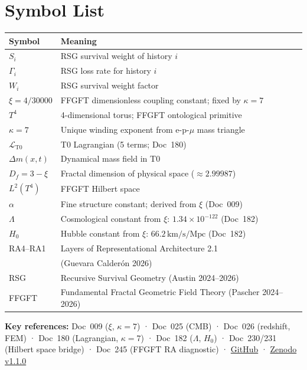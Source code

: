 \section{Symbol List}

{\small
\begin{tabular}{p{3cm}p{10.5cm}}
\toprule
\textbf{Symbol} & \textbf{Meaning} \\
\midrule
$S_i$ & RSG survival weight of history $i$ \\
$\Gamma_i$ & RSG loss rate for history $i$ \\
$W_i$ & RSG survival weight factor \\
$\xi = 4/30000$ & FFGFT dimensionless coupling constant; fixed by $\kappa=7$ \\
$T^4$ & 4-dimensional torus; FFGFT ontological primitive \\
$\kappa = 7$ & Unique winding exponent from e-p-$\mu$ mass triangle \\
$\mathcal{L}_{\text{T0}}$ & T0 Lagrangian (5 terms; Doc~180) \\
$\Delta m(x,t)$ & Dynamical mass field in T0 \\
$D_f = 3-\xi$ & Fractal dimension of physical space ($\approx 2.99987$) \\
$L^2(T^4)$ & FFGFT Hilbert space \\
$\alpha$ & Fine structure constant; derived from $\xi$ (Doc~009) \\
$\Lambda$ & Cosmological constant from $\xi$: $1.34\times10^{-122}$ (Doc~182) \\
$H_0$ & Hubble constant from $\xi$: $66.2\,\text{km/s/Mpc}$ (Doc~182) \\
RA4--RA1 & Layers of Representational Architecture 2.1\\
          & \quad (Guevara Calderón 2026) \\
RSG & Recursive Survival Geometry (Austin 2024--2026) \\
FFGFT & Fundamental Fractal Geometric Field Theory (Pascher 2024--2026) \\
\bottomrule
\end{tabular}
}

\vspace{1em}
\noindent\textbf{Key references:}
Doc~009 ($\xi$, $\kappa=7$) ·
Doc~025 (CMB) ·
Doc~026 (redshift, FEM) ·
Doc~180 (Lagrangian, $\kappa=7$) ·
Doc~182 ($\Lambda$, $H_0$) ·
Doc~230/231 (Hilbert space bridge) ·
Doc~245 (FFGFT RA diagnostic) ·
\href{https://github.com/jpascher/T0-Time-Mass-Duality}{GitHub} ·
\href{https://doi.org/10.5281/zenodo.20117635}{Zenodo v1.1.0}
